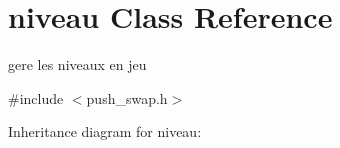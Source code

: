\hypertarget{classniveau}{}\section{niveau Class Reference}
\label{classniveau}


gere les niveaux en jeu  




{\ttfamily \#include $<$push\+\_\+swap.\+h$>$}



Inheritance diagram for niveau\+:
